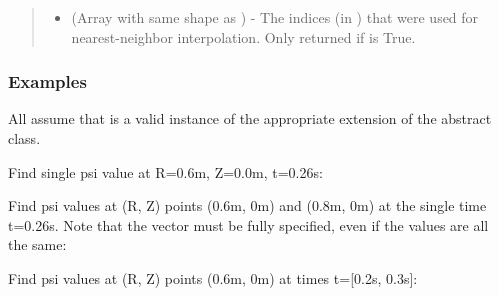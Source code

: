 \documentclass[letterpaper,10pt,english]{sphinxmanual}
\begin{document}
\begin{fulllineitems}
\begin{fulllineitems}
\begin{quote}
\begin{description}
\begin{itemize}
\item {} 
 (Array with same shape as ) - The indices
(in ) that were used for
nearest-neighbor interpolation. Only returned if  is
True.

\end{itemize}


\end{description}\end{quote}
\subsubsection*{Examples}

All assume that  is a valid instance of the appropriate
extension of the {\hyperref[\detokenize{eqtools:eqtools.core.Equilibrium}]{}} abstract class.

Find single psi value at R=0.6m, Z=0.0m, t=0.26s:

\begin{sphinxVerbatim}[commandchars=\\\{\}]
    
\end{sphinxVerbatim}

Find psi values at (R, Z) points (0.6m, 0m) and (0.8m, 0m) at the
single time t=0.26s. Note that the  vector must be fully
specified, even if the values are all the same:

\begin{sphinxVerbatim}[commandchars=\\\{\}]
  \PYG{p}{[} \PYG{p}{]} \PYG{p}{[} \PYG{p}{]} 
\end{sphinxVerbatim}

Find psi values at (R, Z) points (0.6m, 0m) at times t={[}0.2s, 0.3s{]}:

\begin{sphinxVerbatim}[commandchars=\\\{\}]
    \PYG{p}{[} \PYG{p}{]}
\end{sphinxVerbatim}


\end{fulllineitems}
\end{fulllineitems}
\end{document}
